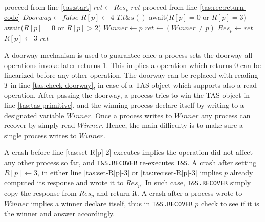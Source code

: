\begin{algorithm}
\begin{multicols}{2}
\begin{algorithmic}[1]
		 \label{tas:rec:start}
			\State proceed from line \ref{tas:start}
		\EndIf
		 \label{tas:rec:return-operation-done}
			\State $ret \gets Res_p$
			\State \Return $ret$
		\EndIf
		 \label{tas:rec:check-winner}
			\State proceed from line \ref{tas:rec:return-code}
		\EndIf
		\State $Doorway \gets false$ \label{tas:rec:close-doorway}
		\State $R[p] \gets 4$ \label{tas:rec:set-R[p]-4}
		\State $T.t\&s()$ \label{tas:rec:tas-primitive}
		 \label{tas:rec:wait-lower-id}
			\State await($R[p] = 0$ or $R[p] = 3$)
		\EndFor
		 \label{tas:rec:wait-higher-id}
			\State await($R[p] = 0$ or $R[p]>2$)
		\EndFor
		 \label{tas:rec:winner-not-overwrite}
			\State $Winner \gets p$ \label{tas:rec:write-winner}
		\EndIf
		\State $ret \gets (Winner \neq p)$ \label{tas:rec:return-code}
		\State $Res_p \gets ret$
		\State $R[p] \gets 3$ \label{tas:rec:set-R[p]-3}
		\State \Return $ret$
		\EndProcedure
	\end{algorithmic}
\end{multicols}
\end{algorithm}


A doorway mechanism is used to guarantee once a process sets the doorway all operations invoke later returns 1. This implies a operation which returns 0 can be linearized before any other operation. The doorway can be replaced with reading $T$ in line \ref{tas:check-doorway}, in case of a TAS object which supports also a read operation.
After passing the doorway, a process tries to win the TAS object in line \ref{tas:tas-primitive}, and the winning process declare itself by writing to a designated variable $Winner$. Once a process writes to $Winner$ any process can recover by simply read $Winner$. Hence, the main difficulty is to make sure a single process writes to $Winner$.

A crash before line \ref{tas:set-R[p]-2} executes implies the operation did not affect any other process so far, and \texttt{T\&S.RECOVER} re-executes \texttt{T\&S}. A crash after setting $R[p] \gets 3$, in either line \ref{tas:set-R[p]-3} or \ref{tas:rec:set-R[p]-3} implies $p$ already computed its response and wrote it to $Res_p$. In such case, \texttt{T\&S.RECOVER} simply copy the response from $Res_p$ and return it. A crash after a process wrote to $Winner$ implies a winner declare itself, thus in \texttt{T\&S.RECOVER} $p$ check to see if it is the winner and answer accordingly.

